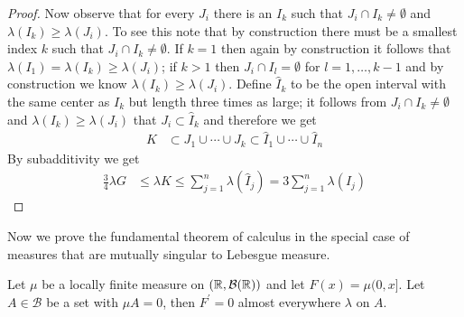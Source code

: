 \begin{proof}
Now observe that for every $J_i$ there is an $I_k$ such that $J_i \cap I_k \neq \emptyset$ and $\lambda(I_k) \geq \lambda(J_i)$.  
To see this note that by construction there must be a smallest index $k$ such that $J_i \cap I_k \neq \emptyset$.  If $k=1$ then again by construction
it follows that $\lambda(I_1)=\lambda(I_k) \geq \lambda(J_i)$; if $k>1$ then $J_i \cap I_l = \emptyset$ for $l=1, \dotsc, k-1$ and 
by construction we know $\lambda(I_k) \geq \lambda(J_i)$.  Define $\hat{I}_k$ to be the open interval with the same center as $I_k$ but length
three times as large; it follows from 
$J_i \cap I_k \neq \emptyset$ and $\lambda(I_k) \geq \lambda(J_i)$ that $J_i \subset \hat{I}_k$ and therefore we get 
\begin{align*}
K &\subset J_1 \cup \dotsb \cup J_k \subset \hat{I}_1 \cup \dotsb \cup \hat{I}_n
\end{align*}
By subadditivity we get
\begin{align*}
\frac{3}{4} \lambda{G} &\leq \lambda{K} \leq \sum_{j=1}^n \lambda(\hat{I}_j) = 3 \sum_{j=1}^n \lambda(I_j) 
\end{align*}
\end{proof}
Now we prove the fundamental theorem of calculus in the special case of measures that are mutually singular to
Lebesgue measure.
\begin{lem}\label{DifferentiationOnNullSets}Let $\mu$ be a locally finite measure on $(\mathbb{R}, \mathcal{B}(\mathbb{R}))$
  and let $F(x) = \mu (0,x]$.  Let $A \in \mathcal{B}$ be a set with
  $\mu A = 0$, then $F^\prime = 0$ almost everywhere $\lambda$ on $A$.
\end{lem}
